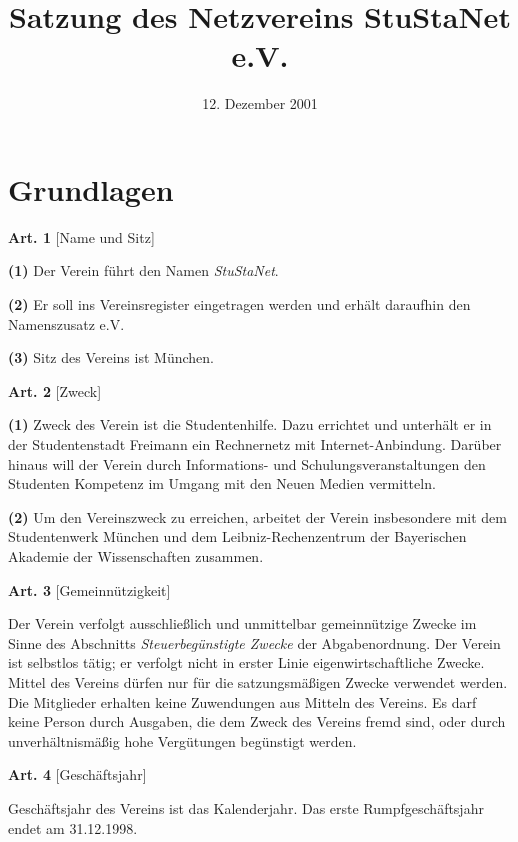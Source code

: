 \documentclass[12pt]{article}
\title{\bf Satzung des Netzvereins StuStaNet e.V.}
\date{12. Dezember 2001}
\newcommand{\Abschnitt}[1]{\section{#1}}
\newcommand{\Satz}[2]{

\begin{samepage}
{\bf (#1)} #2
\end{samepage}
}
\newenvironment{Artikel}[2]{
\bigskip \centerline{{\bf Art. #1} [#2]}
\nopagebreak
}{
}
\begin{document}
\maketitle

\Abschnitt{Grundlagen}

\begin{Artikel}{1}{Name und Sitz}

\Satz{1}{Der Verein führt den Namen {\it StuStaNet}.}

\Satz{2}{Er soll ins Vereinsregister eingetragen werden und erhält
daraufhin den Namenszusatz e.V.}

\Satz{3}{Sitz des Vereins ist München.}

\end{Artikel}

\begin{Artikel}{2}{Zweck}

\Satz{1}{Zweck des Verein ist die Studentenhilfe. Dazu errichtet und unterhält
er in der Studentenstadt Freimann ein Rechnernetz mit Internet-Anbindung.
Darüber hinaus will der Verein durch Informations- und Schulungsveranstaltungen
den Studenten Kompetenz im Umgang mit den Neuen Medien vermitteln.}

\Satz{2}{Um den Vereinszweck zu erreichen, arbeitet der Verein insbesondere mit
dem Studentenwerk München und dem Leibniz-Rechenzentrum der Bayerischen
Akademie der Wissenschaften zusammen.}

\end{Artikel}

\begin{Artikel}{3}{Gemeinnützigkeit}

Der Verein verfolgt ausschließlich und unmittelbar gemeinnützige Zwecke im
Sinne des Abschnitts {\it Steuerbegünstigte Zwecke} der Abgabenordnung.  Der
Verein ist selbstlos tätig; er verfolgt nicht in erster Linie
eigenwirtschaftliche Zwecke. Mittel des Vereins dürfen nur für die
satzungsmäßigen Zwecke verwendet werden. Die Mitglieder erhalten keine
Zuwendungen aus Mitteln des Vereins. Es darf keine Person durch Ausgaben, die
dem Zweck des Vereins fremd sind, oder durch unverhältnismäßig hohe Vergütungen
begünstigt werden.

\end{Artikel}


\begin{Artikel}{4}{Geschäftsjahr}

Geschäftsjahr des Vereins ist das Kalenderjahr. Das erste Rumpfgeschäftsjahr
endet am 31.12.1998.

\end{Artikel}
\end{document}
